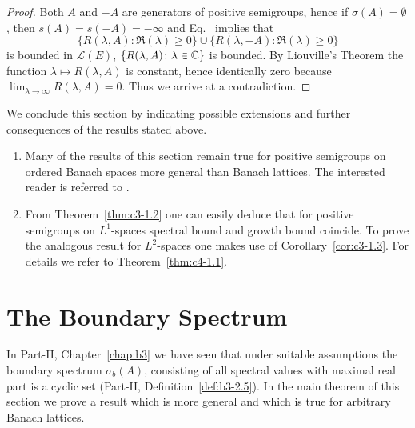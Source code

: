 \begin{proof}
Both $A$ and $-A$ are generators of positive semigroups, hence if\/ $\sigma(A) = \emptyset$, then $s(A) = s(-A) = -\infty$ and Eq.~ implies that 
\[
\{R(\lambda,A) \colon \Re(\lambda) \geq 0\} \cup \{R(\lambda,-A) \colon \Re(\lambda) \geq 0\}
\]
is bounded in $\mathcal{L}(E)$, \ie  $\{R(\lambda,A) \colon \lambda \in \mathbb{C} \}$ is bounded.
By Liouville's Theorem the function $\lambda \mapsto R(\lambda,A)$ is constant, hence identically zero because $\displaystyle \lim_{\lambda\to\infty}R(\lambda,A) = 0$.
Thus we arrive at a contradiction.
\end{proof}
We conclude this section by indicating possible extensions and further consequences of the results stated above.
\begin{remarks}\label{rem:c3-1.7}
\begin{enumerate}[\upshape (i), wide, labelindent=.25em]
	\item 
	Many of the results of this section remain true for positive semigroups on ordered Banach spaces more general than Banach lattices.
	The interested reader is referred to \textcite{greinervoigtwolff:1981}.
	
	\item 
	From Theorem~\ref{thm:c3-1.2} one can easily deduce that for positive semigroups on $L^1$-spaces spectral bound and growth bound coincide.
	To prove the analogous result for $L^2$-spaces one makes use of Corollary~\ref{cor:c3-1.3}.
	For details we refer to Theorem~\ref{thm:c4-1.1}.
\end{enumerate}
\end{remarks}
\section{The Boundary Spectrum}\label{sec:c3-2}
In Part-II, Chapter~\ref{chap:b3} we have seen that under suitable assumptions the boundary spectrum $\sigma_{b}(A)$, consisting of all spectral values with maximal real part is a cyclic set (\cf Part-II, Definition~\ref{def:b3-2.5}).
In the main theorem of this section we prove a result which is more general and which is true for arbitrary Banach lattices.

